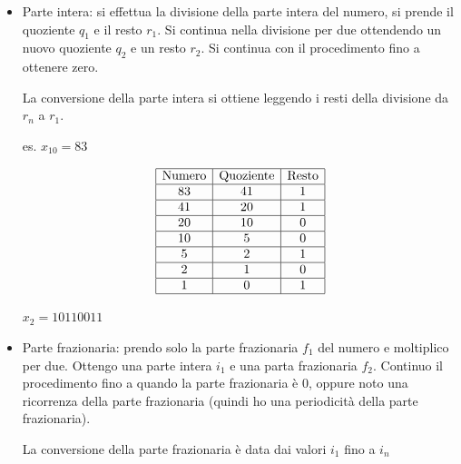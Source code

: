 \documentclass[a4paper, 11pt]{article}
\begin{document}
            \begin{itemize}
                \item Parte intera: si effettua la divisione della parte intera del numero, si prende il quoziente $q_1$ e il resto $r_1$. Si continua nella divisione per due ottendendo un nuovo quoziente $q_2$ e un resto $r_2$. Si continua con il procedimento fino a ottenere zero. 
                
                La conversione della parte intera si ottiene leggendo i resti della divisione da $r_n$ a $r_1$.

                es. $x_{10} = 83$ 



                \[
                    \begin{array}{|c|c|c|}
                        \hline
                        \text{Numero} & \text{Quoziente} & \text{Resto} \\ 
                        \hline
                        83 & 41 & 1 \\ 
                        \hline
                        41 & 20 & 1 \\ 
                        \hline
                        20 & 10 & 0 \\ 
                        \hline
                        10 & 5 & 0 \\ 
                        \hline
                        5 & 2 & 1 \\ 
                        \hline
                        2 & 1 & 0 \\ 
                        \hline
                        1 & 0 & 1 \\ 
                        \hline
                    \end{array}
                \]



                $x_2 = 10110011$

                \item Parte frazionaria: prendo solo la parte frazionaria $f_1$ del numero e moltiplico per due. Ottengo una parte intera $i_1$ e una parta frazionaria $f_2$. Continuo il procedimento fino a quando la parte frazionaria è $0$, oppure noto una ricorrenza della parte frazionaria (quindi ho una periodicità della parte frazionaria).
                
                La conversione della parte frazionaria è data dai valori $i_1$ fino a $i_n$
                

\end{itemize}
\end{document}
